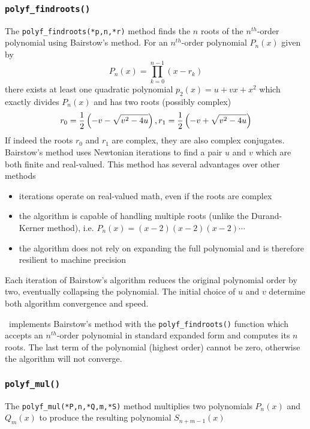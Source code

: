 \subsubsection{{\tt polyf\_findroots()}}
\label{module:math:poly:polyf_findroots}
The {\tt polyf\_findroots(*p,n,*r)} method
finds the $n$ roots of the $n^{th}$-order polynomial using Bairstow's
method.
For an $n^{th}$-order polynomial $P_n(x)$ given by
%
\begin{equation}
\label{eqn:math:poly:roots}
    P_n(x) = \prod_{k=0}^{n-1}{(x-r_k)}
\end{equation}
%
there exists at least one quadratic polynomial $p_{2}(x)=u + vx + x^2$ which
exactly divides $P_{n}(x)$ and has two roots (possibly complex)
%
\begin{equation}
\label{eqn:math:poly:complex_roots}
    r_0 = \frac{1}{2}\left(-v-\sqrt{v^2-4u}\right), \; \\
    r_1 = \frac{1}{2}\left(-v+\sqrt{v^2-4u}\right)
\end{equation}
%
If indeed the roots $r_0$ and $r_1$ are complex, they are also complex
conjugates.
Bairstow's method uses Newtonian iterations to find a pair $u$ and $v$ which
are both finite and real-valued.
This method has several advantages over other methods
\begin{itemize}
\item iterations operate on real-valued math, even if the roots are complex
\item the algorithm is capable of handling multiple roots (unlike the
      Durand-Kerner method), i.e. $P_{n}(x) = (x-2)(x-2)(x-2)\cdots$
\item the algorithm does not rely on expanding the full polynomial and is
      therefore resilient to machine precision
\end{itemize}
Each iteration of Bairstow's algorithm reduces the original polynomial order
by two, eventually collapsing the polynomial.
The initial choice of $u$ and $v$ determine both algorithm convergence and
speed.

\liquid\ implements Bairstow's method with the {\tt polyf\_findroots()}
function which accepts an $n^{th}$-order polynomial in standard expanded form
and computes its $n$ roots.
The last term of the polynomial (highest order) cannot be zero, otherwise the
algorithm will not converge.


\subsubsection{{\tt polyf\_mul()}}
\label{module:math:poly:polyf_mul}
The {\tt polyf\_mul(*P,n,*Q,m,*S)} method
multiplies two polynomials $P_n(x)$ and $Q_m(x)$ to produce the
resulting polynomial $S_{n+m-1}(x)$


